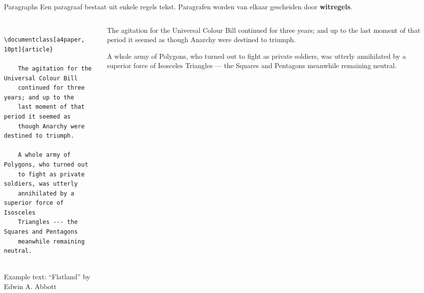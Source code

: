 \copyrightTim

\begin{frame}[fragile, t]{Paragraphs}
	Een paragraaf bestaat uit enkele regels tekst. Paragrafen worden van elkaar gescheiden door \textbf{witregels}.\newline
	\begin{columns}[t]
        \begin{column}{0.5\textwidth}
	\begin{verbatim} 
	\documentclass[a4paper, 10pt]{article}
	
	The agitation for the Universal Colour Bill 
	continued for three years; and up to the 
	last moment of that period it seemed as 
	though Anarchy were destined to triumph.

	A whole army of Polygons, who turned out 
	to fight as private soldiers, was utterly 
	annihilated by a superior force of Isosceles 
	Triangles --- the Squares and Pentagons 
	meanwhile remaining neutral.
	
	\end{verbatim}
	{\tiny
	Example text: ``Flatland''
	by Edwin A. Abbott
	}\par
	\end{column}
	\begin{column}{0.5\textwidth}
	\vspace{0pt}
	\begin{tcolorbox}\small \setlength\parindent{20pt}
	The agitation for the Universal Colour Bill continued for three years; 
	and up to the last moment of that period it seemed as though Anarchy 
	were destined to triumph.

	A whole army of Polygons, who turned out to fight as private soldiers, 
	was utterly annihilated by a superior force of Isosceles 
	Triangles --- the Squares and Pentagons meanwhile remaining neutral.
	\end{tcolorbox}
\end{column}
\end{columns}

\end{frame}
